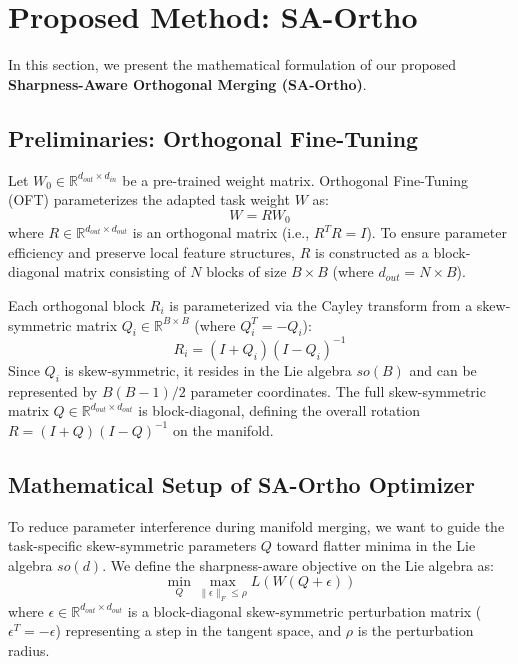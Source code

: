 \documentclass{article}
\theoremstyle{plain}
\theoremstyle{definition}
\theoremstyle{remark}
\begin{document}
\section{Proposed Method: SA-Ortho}
\label{submission-method}

In this section, we present the mathematical formulation of our proposed \textbf{Sharpness-Aware Orthogonal Merging (SA-Ortho)}.

\subsection{Preliminaries: Orthogonal Fine-Tuning}
Let $W_0 \in \mathbb{R}^{d_{out} \times d_{in}}$ be a pre-trained weight matrix. Orthogonal Fine-Tuning (OFT) parameterizes the adapted task weight $W$ as:
\begin{equation}
  W = R W_0
\end{equation}
where $R \in \mathbb{R}^{d_{out} \times d_{out}}$ is an orthogonal matrix (i.e., $R^T R = I$). To ensure parameter efficiency and preserve local feature structures, $R$ is constructed as a block-diagonal matrix consisting of $N$ blocks of size $B \times B$ (where $d_{out} = N \times B$).

Each orthogonal block $R_i$ is parameterized via the Cayley transform from a skew-symmetric matrix $Q_i \in \mathbb{R}^{B \times B}$ (where $Q_i^T = -Q_i$):
\begin{equation}
  R_i = (I + Q_i)(I - Q_i)^{-1}
\end{equation}
Since $Q_i$ is skew-symmetric, it resides in the Lie algebra $so(B)$ and can be represented by $B(B-1)/2$ parameter coordinates. The full skew-symmetric matrix $Q \in \mathbb{R}^{d_{out} \times d_{out}}$ is block-diagonal, defining the overall rotation $R = (I + Q)(I - Q)^{-1}$ on the manifold.

\subsection{Mathematical Setup of SA-Ortho Optimizer}
To reduce parameter interference during manifold merging, we want to guide the task-specific skew-symmetric parameters $Q$ toward flatter minima in the Lie algebra $so(d)$. We define the sharpness-aware objective on the Lie algebra as:
\begin{equation}
  \min_Q \max_{\|\epsilon\|_F \leq \rho} L(W(Q + \epsilon))
\end{equation}
where $\epsilon \in \mathbb{R}^{d_{out} \times d_{out}}$ is a block-diagonal skew-symmetric perturbation matrix ($\epsilon^T = -\epsilon$) representing a step in the tangent space, and $\rho$ is the perturbation radius.
\end{document}
